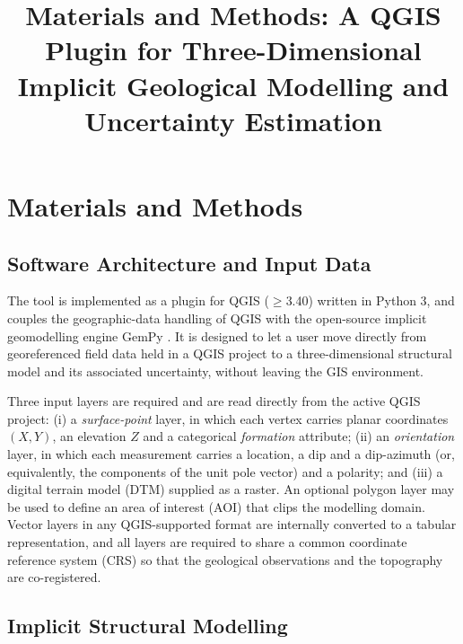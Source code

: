\documentclass[11pt,a4paper]{article}
\title{Materials and Methods: A QGIS Plugin for Three-Dimensional
Implicit Geological Modelling and Uncertainty Estimation}
\author{}
\date{}
\begin{document}
\maketitle

\section{Materials and Methods}

\subsection{Software Architecture and Input Data}

The tool is implemented as a plugin for QGIS ($\geq$3.40) written in
Python 3, and couples the geographic-data handling of QGIS with the
open-source implicit geomodelling engine GemPy \cite{Gempy_2021}. It is
designed to let a user move directly from georeferenced field data held
in a QGIS project to a three-dimensional structural model and its
associated uncertainty, without leaving the GIS environment.

Three input layers are required and are read directly from the active
QGIS project: (i) a \emph{surface-point} layer, in which each vertex
carries planar coordinates $(X, Y)$, an elevation $Z$ and a categorical
\emph{formation} attribute; (ii) an \emph{orientation} layer, in which
each measurement carries a location, a dip and a dip-azimuth (or,
equivalently, the components of the unit pole vector) and a polarity; and
(iii) a digital terrain model (DTM) supplied as a raster. An optional
polygon layer may be used to define an area of interest (AOI) that clips
the modelling domain. Vector layers in any QGIS-supported format are
internally converted to a tabular representation, and all layers are
required to share a common coordinate reference system (CRS) so that the
geological observations and the topography are co-registered.

\subsection{Implicit Structural Modelling}
\end{document}
